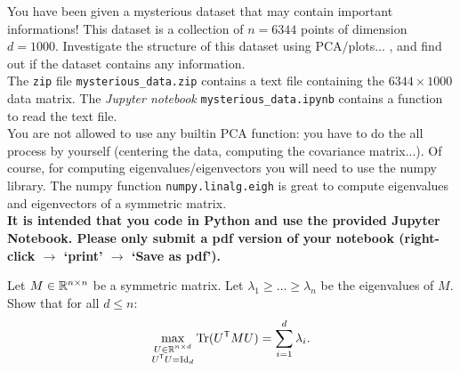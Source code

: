 \documentclass[11pt,nocut]{article}
\begin{document}
\begin{problem}[3 points]
	You have been given a mysterious dataset that may contain important informations! This dataset is a collection of $n=6344$ points of dimension $d=1000$.
	Investigate the structure of this dataset using PCA/plots... , and find out if the dataset contains any information.
	\\

	The \texttt{zip} file \texttt{mysterious\_data.zip} contains a text file containing the $6344\times 1000$ data matrix.
	The \emph{Jupyter notebook} \texttt{mysterious\_data.ipynb} contains a function to read the text file.
\\

	You are not allowed to use any builtin PCA function: you have to do the all process by yourself (centering the data, computing the covariance matrix...). Of course, for computing eigenvalues/eigenvectors you will need to use the numpy library.
	The numpy function \texttt{numpy.linalg.eigh} is great to compute eigenvalues and eigenvectors of a symmetric matrix. 
	\\

	\textbf{It is intended that you code in Python and use the provided Jupyter Notebook. Please only submit a pdf version of your notebook (right-click $\to$ `print' $\to$ `Save as pdf').}
\end{problem}


\vspace{5mm}

\begin{problem}[$\star$]
	Let $M \in \mathbb{R}^{n \times n}$ be a symmetric matrix. Let $\lambda_1 \geq \dots \geq \lambda_n$ be the eigenvalues of $M$. Show that for all $d \leq n$:
	$$
	\max_{\substack{U \in \mathbb{R}^{n\times d} \\ U^{{\sf T}} U = {{\rm Id}}_d}} {{\rm Tr}}(U^{{\sf T}} M U) = \sum_{i=1}^d \lambda_i.
	$$
\end{problem}
\vspace{1cm}
\centerline{}

%
%
\end{document}
